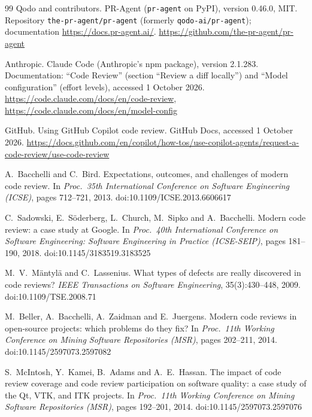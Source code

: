 \documentclass[11pt,a4paper]{article}
\begin{document}
\begin{thebibliography}{99}
Qodo and contributors.
\newblock PR-Agent (\texttt{pr-agent} on PyPI), version 0.46.0, MIT.
Repository \texttt{the-pr-agent/pr-agent} (formerly
\texttt{qodo-ai/pr-agent}); documentation \url{https://docs.pr-agent.ai/}.
\newblock \url{https://github.com/the-pr-agent/pr-agent}

Anthropic.
\newblock Claude Code (Anthropic's npm package), version
2.1.283. Documentation: ``Code Review'' (section ``Review a diff
locally'') and ``Model configuration'' (effort levels), accessed
1 October 2026.
\newblock \url{https://code.claude.com/docs/en/code-review},
\url{https://code.claude.com/docs/en/model-config}

GitHub.
\newblock Using GitHub Copilot code review. GitHub Docs, accessed
1 October 2026.
\newblock
\url{https://docs.github.com/en/copilot/how-tos/use-copilot-agents/request-a-code-review/use-code-review}

A.~Bacchelli and C.~Bird.
\newblock Expectations, outcomes, and challenges of modern code review.
\newblock In \emph{Proc.\ 35th International Conference on Software
Engineering (ICSE)}, pages 712--721, 2013.
\newblock doi:10.1109/ICSE.2013.6606617

C.~Sadowski, E.~S\"oderberg, L.~Church, M.~Sipko and A.~Bacchelli.
\newblock Modern code review: a case study at Google.
\newblock In \emph{Proc.\ 40th International Conference on Software
Engineering: Software Engineering in Practice (ICSE-SEIP)}, pages
181--190, 2018.
\newblock doi:10.1145/3183519.3183525

M.~V.~M\"antyl\"a and C.~Lassenius.
\newblock What types of defects are really discovered in code reviews?
\newblock \emph{IEEE Transactions on Software Engineering},
35(3):430--448, 2009.
\newblock doi:10.1109/TSE.2008.71

M.~Beller, A.~Bacchelli, A.~Zaidman and E.~Juergens.
\newblock Modern code reviews in open-source projects: which problems do
they fix?
\newblock In \emph{Proc.\ 11th Working Conference on Mining Software
Repositories (MSR)}, pages 202--211, 2014.
\newblock doi:10.1145/2597073.2597082

S.~McIntosh, Y.~Kamei, B.~Adams and A.~E.~Hassan.
\newblock The impact of code review coverage and code review participation
on software quality: a case study of the Qt, VTK, and ITK projects.
\newblock In \emph{Proc.\ 11th Working Conference on Mining Software
Repositories (MSR)}, pages 192--201, 2014.
\newblock doi:10.1145/2597073.2597076


\end{thebibliography}
\end{document}
